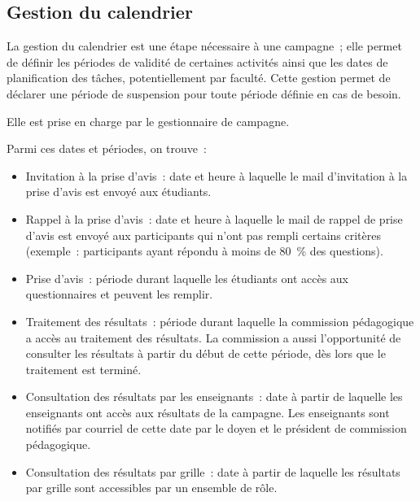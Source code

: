 \documentclass[a4paper,11pt]{report}
\begin{document}
\subsection{Gestion du calendrier}
La gestion du calendrier est une étape nécessaire à une campagne~; elle permet de définir les périodes de validité de certaines activités ainsi que les dates de planification des tâches, potentiellement par faculté.
Cette gestion permet de déclarer une période de suspension pour toute période définie en cas de besoin.

\noindent Elle est prise en charge par le gestionnaire de campagne.

\noindent Parmi ces dates et périodes, on trouve~:
\begin{itemize}
	\item Invitation à la prise d'avis~: date et heure à laquelle le mail d'invitation à la prise d'avis est envoyé aux étudiants.
	\item Rappel à la prise d'avis~: date et heure à laquelle le mail de rappel de prise d'avis est envoyé aux participants qui n'ont pas rempli certains critères (exemple~: participants ayant répondu à moins de 80~\% des questions).
	\item Prise d'avis~: période durant laquelle les étudiants ont accès aux questionnaires et peuvent les remplir.
	\item Traitement des résultats~: période durant laquelle la commission pédagogique a accès au traitement des résultats. La commission a aussi l'opportunité de consulter les résultats à partir du début de cette période, dès lors que le traitement est terminé.
	\item Consultation des résultats par les enseignants~: date à partir de laquelle les enseignants ont accès aux résultats de la campagne.
	Les enseignants sont notifiés par courriel de cette date par le doyen et le président de commission pédagogique.
	\item Consultation des résultats par grille~: date à partir de laquelle les résultats par grille sont accessibles par un ensemble de rôle.
\end{itemize}
~\newline{}
\end{document}
